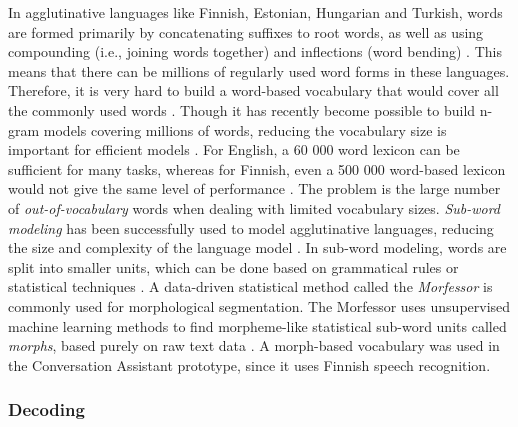 \documentclass[english, 12pt, a4paper, pdftex, elec, utf8]{aaltothesis}
\begin{document}
In agglutinative languages like Finnish, Estonian, Hungarian and Turkish, words are formed primarily by concatenating suffixes to root words, as well as using compounding (i.e., joining words together) and inflections (word bending) \cite{arisoy2008statistical, kurimo2006unlimited, hirsimaki2006unlimited}. This means that there can be millions of regularly used word forms in these languages. Therefore, it is very hard to build a word-based vocabulary that would cover all the commonly used words \cite{arisoy2008statistical}. Though it has recently become possible to build n-gram models covering millions of words, reducing the vocabulary size is important for efficient models \cite{smit17boundaries}. For English, a 60 000 word lexicon can be sufficient for many tasks, whereas for Finnish, even a 500 000 word-based lexicon would not give the same level of performance \cite{arisoy2008statistical}. The problem is the large number of \textit{out-of-vocabulary} words when dealing with limited vocabulary sizes. \textit{Sub-word modeling} has been successfully used to model agglutinative languages, reducing the size and complexity of the language model \cite{enarvi2017automatic, hirsimaki2009importance, hirsimaki2006unlimited, smit17boundaries}. In sub-word modeling, words are split into smaller units, which can be done based on grammatical rules or statistical techniques \cite{arisoy2008statistical}. A data-driven statistical method called the \textit{Morfessor} is commonly used for morphological segmentation. The Morfessor uses unsupervised machine learning methods to find morpheme-like statistical sub-word units called \textit{morphs}, based purely on raw text data \cite{arisoy2008statistical, kurimo2006unlimited}. A morph-based vocabulary was used in the Conversation Assistant prototype, since it uses Finnish speech recognition.

\subsubsection{Decoding} \label{sec:decoding}
\end{document}
